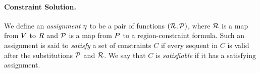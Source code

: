 \paragraph{Constraint Solution.}
We define an \emph{assignment} $\eta$ to be a pair of functions $(\mathcal{R},\mathcal{P})$,
where $\mathcal{R}$ is a map from $V$ to $R$
and $\mathcal{P}$ is a map from $P$ to a region-constraint formula.
Such an assignment is said to \emph{satisfy} a set of constraints $C$ if
every sequent in $C$ is valid after the substitutions $\mathcal{P}$ and $ \mathcal{R}$.
We say that $C$ is \emph{satisfiable} if it has a satisfying assignment.

%
%

